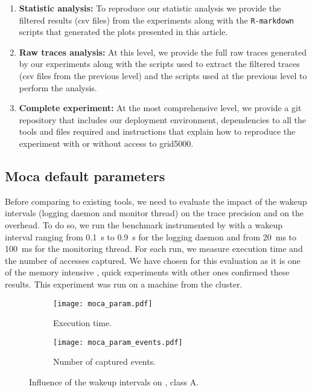 \begin{enumerate}
    \item \textbf{Statistic analysis:} To reproduce our statistic analysis we provide
        the filtered results (csv files) from the experiments along with the
        \texttt{R-markdown} scripts that generated the plots presented in this
        article.
    \item \textbf{Raw traces analysis:} At this level, we provide the full raw traces
        generated by our experiments along with the scripts used to extract the
        filtered traces (csv files from the previous level) and the scripts used
	at the previous level to perform the analysis.
    \item \textbf{Complete experiment:} At the most comprehensive level, we provide a git
        repository that includes our deployment environment, dependencies to all the
        tools and files required and instructions that explain how
        to reproduce the experiment with or without access to grid5000.
\end{enumerate}


\subsection{Moca default parameters}
\label{sec:expe-param}

Before comparing \Moca to existing tools, we need to evaluate the impact of
the wakeup intervals (logging daemon and monitor thread) on the trace
precision and on the overhead. To do so, we run the \IS benchmark instrumented by \Moca with
a wakeup interval ranging from \SI{0.1}{s} to  \SI{0.9}{s} for the logging daemon and from \SI{20}{ms} to
\SI{100}{ms} for the monitoring thread. For each run, we measure \IS execution time and the number of
accesses captured. We have chosen \IS for this evaluation as it is one of the memory intensive \NPB,
quick experiments with other ones confirmed these results. This experiment was
run on a machine from the \Edel cluster.

\begin{figure}[htb]
    \centering
    \begin{subfigure}{.9\linewidth}
        \texttt{[image: moca\_param.pdf]}
        \caption{Execution time.}
        \label{fig:param_time}
    \end{subfigure}
    \begin{subfigure}{.9\linewidth}
        \texttt{[image: moca\_param\_events.pdf]}
        \caption{Number of captured events.}
        \label{fig:param_evts}
    \end{subfigure}
    \caption{Influence of the wakeup intervals on \IS, class A.}
    \label{fig:param}
\end{figure}


